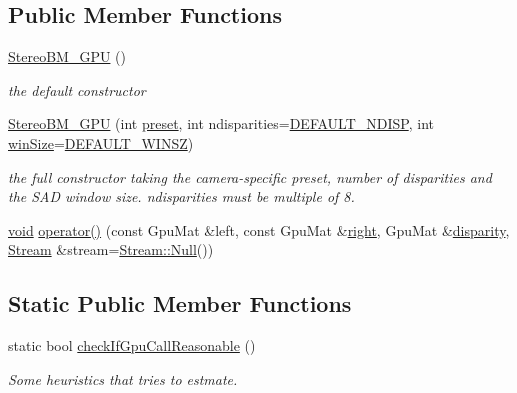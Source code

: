 \subsection*{Public Member Functions}
\begin{DoxyCompactItemize}
\item 
\hyperlink{classcv_1_1gpu_1_1StereoBM__GPU_a8878511db98d6ad7e08c56412abb658b}{Stereo\-B\-M\-\_\-\-G\-P\-U} ()
\begin{DoxyCompactList}\small\item\em the default constructor \end{DoxyCompactList}\item 
\hyperlink{classcv_1_1gpu_1_1StereoBM__GPU_afcb74a217b436713ae13306c33e9a9e1}{Stereo\-B\-M\-\_\-\-G\-P\-U} (int \hyperlink{classcv_1_1gpu_1_1StereoBM__GPU_a82683f26180823d2e8480b1deecff658}{preset}, int ndisparities=\hyperlink{classcv_1_1gpu_1_1StereoBM__GPU_a9634c58ae2540020ce01fe00c3a076f0a49001735748b7f3d533568c30a578f36}{D\-E\-F\-A\-U\-L\-T\-\_\-\-N\-D\-I\-S\-P}, int \hyperlink{classcv_1_1gpu_1_1StereoBM__GPU_a1d849fcce4681317150454fbd685dbc8}{win\-Size}=\hyperlink{classcv_1_1gpu_1_1StereoBM__GPU_a9634c58ae2540020ce01fe00c3a076f0af32dfd5296df828cdb74893979fad282}{D\-E\-F\-A\-U\-L\-T\-\_\-\-W\-I\-N\-S\-Z})
\begin{DoxyCompactList}\small\item\em the full constructor taking the camera-\/specific preset, number of disparities and the S\-A\-D window size. ndisparities must be multiple of 8. \end{DoxyCompactList}\item 
\hyperlink{legacy_8hpp_a8bb47f092d473522721002c86c13b94e}{void} \hyperlink{classcv_1_1gpu_1_1StereoBM__GPU_a20bedd874b254eee9ac0bfb79ded113a}{operator()} (const Gpu\-Mat \&left, const Gpu\-Mat \&\hyperlink{legacy_8hpp_a6b04b878081bf724144b73c75dfd1894}{right}, Gpu\-Mat \&\hyperlink{calib3d_8hpp_acd2ef073a3a4984e0a0ebac5c7e179fd}{disparity}, \hyperlink{classcv_1_1gpu_1_1Stream}{Stream} \&stream=\hyperlink{classcv_1_1gpu_1_1Stream_af96c23564834f88333dcb8997df553f1}{Stream\-::\-Null}())
\end{DoxyCompactItemize}
\subsection*{Static Public Member Functions}
\begin{DoxyCompactItemize}
\item 
static bool \hyperlink{classcv_1_1gpu_1_1StereoBM__GPU_aa0c2d6dc1f92e94410c2b3c42c242f0a}{check\-If\-Gpu\-Call\-Reasonable} ()
\begin{DoxyCompactList}\small\item\em Some heuristics that tries to estmate. \end{DoxyCompactList}\end{DoxyCompactItemize}
